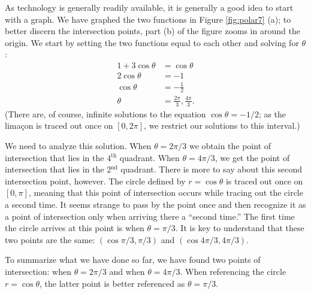 {As technology is generally readily available, it is generally a good idea to start with a graph. We have graphed the two functions in Figure \ref{fig:polar7} (a); to better discern the intersection points, part (b) of the figure zooms in around the origin.
We start by setting the two functions equal to each other and solving for $\theta$:
\begin{align*}
1+3\cos\theta &= \cos \theta \\
2\cos\theta &= -1\\
\cos\theta&= -\frac12\\
\theta &= \frac{2\pi}{3}, \frac{4\pi}{3}.
\end{align*}
(There are, of course, infinite solutions to the equation $\cos\theta=-1/2$; as the lima\c con is traced out once on $[0,2\pi]$, we restrict our solutions to this interval.) 

We need to analyze this solution. When $\theta = 2\pi/3$ we obtain the point of intersection that lies in the 4$^\text{th}$ quadrant. When $\theta = 4\pi/3$, we get the point of intersection that lies in the 2$^\text{nd}$ quadrant. There is more to say about this second intersection point, however. The circle defined by $r=\cos\theta$ is traced out once on $[0,\pi]$, meaning that this point of intersection occurs while tracing out the circle a second time. It seems strange to pass by the point once and then recognize it as a point of intersection only when arriving there a ``second time.'' The first time the circle arrives at this point is when $\theta = \pi/3$.
It is key to understand that these two points are the same: $(\cos \pi/3,\pi/3)$ and $(\cos 4\pi/3,4\pi/3)$. 

To summarize what we have done so far, we have found two points of intersection: when $\theta=2\pi/3$ and when $\theta=4\pi/3$. When referencing the circle $r=\cos \theta$, the latter point is better referenced as $\theta=\pi/3$.

}
